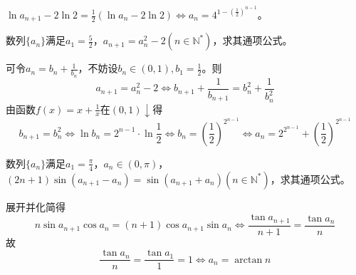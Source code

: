 \documentclass[../sample]{subfiles}
\begin{document}
$\ln a_{n+1}-2\ln 2=\frac{1}{2}(\ln a_n-2\ln 2)\Leftrightarrow a_n=4^{1-(\frac{1}{2})^{n-1}}$。

\begin{problem}
  数列$\{a_n\}$满足$a_1=\frac{5}{2}$，$a_{n+1}=a_n^2-2(n\in\mathbb{N^*})$，求其通项公式。
\end{problem}

可令$a_n=b_n+\frac{1}{b_n}$，不妨设$b_n\in (0,1), b_1=\frac{1}{2}$。则\[a_{n+1}=a_n^2-2\Leftrightarrow b_{n+1}+\frac{1}{b_{n+1}}=b_n^2+\frac{1}{b_n^2}\]
由函数$f(x)=x+\frac{1}{x}在(0, 1)\downarrow$得\[b_{n+1}=b_n^2\Leftrightarrow \ln b_n=2^{n-1}·\ln \frac{1}{2}\Leftrightarrow b_n=(\frac{1}{2})^{2^{n-1}}\Leftrightarrow a_n=2^{2^{n-1}}+(\frac{1}{2})^{2^{n-1}}\]

\begin{problem}
  数列$\{a_n\}$满足$a_1=\frac{\pi}{4}$，$a_n\in (0, \pi)$，$(2n+1)\sin(a_{n+1}-a_n)=\sin(a_{n+1}+a_n)(n\in\mathbb{N^*})$，求其通项公式。
\end{problem}

展开并化简得\[n\sin a_{n+1}\cos a_n=(n+1)\cos a_{n+1}\sin a_n\Leftrightarrow \frac{\tan a_{n+1}}{n+1}=\frac{\tan a_n}{n}\]
故\[\frac{\tan a_n}{n}=\frac{\tan a_1}{1}=1\Leftrightarrow a_n=\arctan n\]
\end{document}
